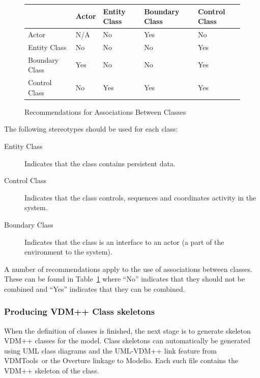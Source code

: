 \documentclass{overturerepchap}
\newcommand{\vdmtools}{VDMTools}
\begin{document}
\begin{figure}
\begin{center}
\begin{tabular}{|l|l|l|l|l|}\hline
         & Actor & Entity Class & Boundary Class &
           Control Class \\ \hline
Actor                        &   N/A  & No & Yes & No \\ \hline
Entity Class &  No    &No\footnotemark & No & Yes \\ \hline
Boundary Class& Yes   & No & No  & Yes \\ \hline
Control Class & No    &Yes & Yes & Yes \\ \hline
\end{tabular}
\end{center}
\caption{Recommendations for Associations Between Classes\label{tab:assoc}}
\end{figure}

The following stereotypes should be used for each class:
\begin{description}
\item[Entity Class] Indicates that the class contains
persistent data.
\item[Control Class] Indicates that the class controls, sequences and coordinates activity in the system.
\item[Boundary Class] Indicates that the class is an
interface to an actor (a part of the environment to the system).
\end{description}

A number of recommendations apply to the use of associations between
classes. These can be found in Table~\ref{tab:assoc} where ``No''
indicates that they should not be combined and ``Yes'' indicates that
they can be combined.

\subsubsection{Producing VDM++ Class skeletons}\label{subsub:skeleton}

When the definition of classes is finished, the next stage is to
generate skeleton VDM++ classes for the model. Class skeletons can
automatically be generated using UML class diagrams and the UML-VDM++
link feature from \vdmtools\ or the Overture linkage to Modelio. 
Each such file contains the VDM++ skeleton of the class. 
\end{document}
